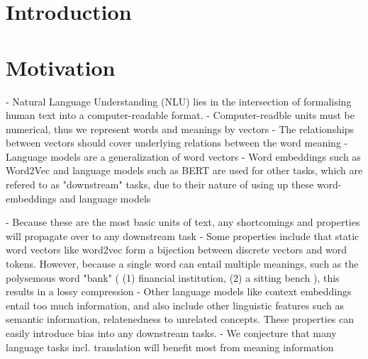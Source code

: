 \documentclass[a4paper,12pt,twoside,openright]{report}
\begin{document}
\pagestyle{empty}
\singlespacing

\onehalfspacing

\singlespacing


\setcounter{page}{0}
\pagestyle{plain}
\tableofcontents
\listoffigures
\listoftables

\onehalfspacing

\newcommand{\norm}[1]{\left\lVert#1\right\rVert}
\newcommand{\bracket}[1]{\left|#1\right|}
\newcommand{\absdet}[1]{\left|#1\right|}
\newcommand{\bftab}{\fontseries{b}\selectfont}

\chapter{Introduction}

\setcounter{page}{1} 

\newpage
\chapter{Motivation}
 
- Natural Language Understanding (NLU) lies in the intersection of formalising human text into a computer-readable format.
- Computer-readble units must be numerical, thus we represent words and meanings by vectors
- The relationships between vectors should cover underlying relations between the word meaning
- Language models are a generalization of word vectors
- Word embeddings such as Word2Vec and language models such as BERT are used for other tasks, which are refered to as "downstream" tasks, due to their nature of using up these word-embeddings and language models

- Because these are the most basic units of text, any shortcomings and properties will propagate over to any downstream task
- Some properties include that static word vectors like word2vec form a bijection between discrete vectors and word tokens. 
However, because a single word can entail multiple meanings, such as the polysemous word "bank" ( (1) financial institution, (2) a sitting bench ), this results in a lossy compression
- Other language models like context embeddings entail too much information, and also include other linguistic features such as semantic information, relatenedness to unrelated concepts.
These properties can easily introduce bias into any downstream tasks.
- We conjecture that many language tasks incl. translation will benefit most from meaning information
\end{document}
